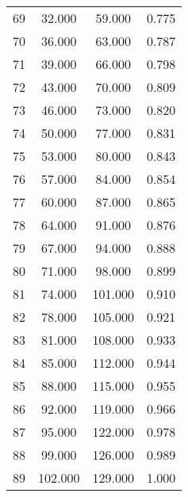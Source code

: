 \begin{tabular}{cccc}
  69 & 32.000 & 59.000 & 0.775 \\ 
  70 & 36.000 & 63.000 & 0.787 \\ 
  71 & 39.000 & 66.000 & 0.798 \\ 
  72 & 43.000 & 70.000 & 0.809 \\ 
  73 & 46.000 & 73.000 & 0.820 \\ 
  74 & 50.000 & 77.000 & 0.831 \\ 
  75 & 53.000 & 80.000 & 0.843 \\ 
  76 & 57.000 & 84.000 & 0.854 \\ 
  77 & 60.000 & 87.000 & 0.865 \\ 
  78 & 64.000 & 91.000 & 0.876 \\ 
  79 & 67.000 & 94.000 & 0.888 \\ 
  80 & 71.000 & 98.000 & 0.899 \\ 
  81 & 74.000 & 101.000 & 0.910 \\ 
  82 & 78.000 & 105.000 & 0.921 \\ 
  83 & 81.000 & 108.000 & 0.933 \\ 
  84 & 85.000 & 112.000 & 0.944 \\ 
  85 & 88.000 & 115.000 & 0.955 \\ 
  86 & 92.000 & 119.000 & 0.966 \\ 
  87 & 95.000 & 122.000 & 0.978 \\ 
  88 & 99.000 & 126.000 & 0.989 \\ 
  89 & 102.000 & 129.000 & 1.000 \\ 
   \hline
\end{tabular}
